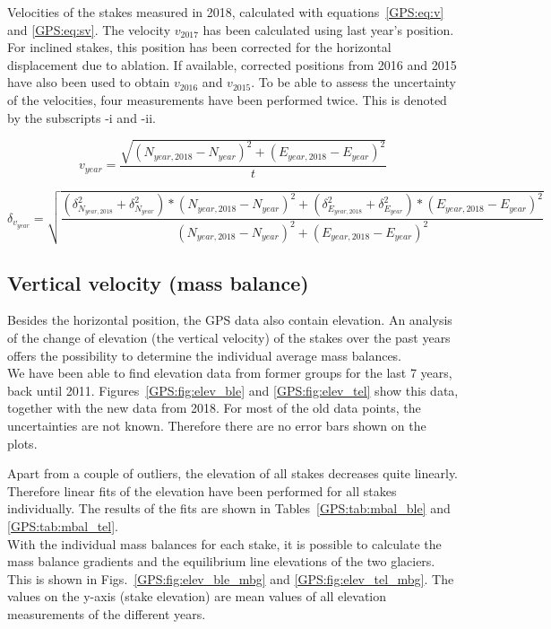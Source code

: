 \begin{table}[htb]
	\caption{Velocities of the stakes measured in 2018, calculated with equations~\ref{GPS:eq:v} and \ref{GPS:eq:sv}.
	The velocity $v_{2017}$ has been calculated using last year's position.
	For inclined stakes, this position has been corrected for the horizontal displacement due to ablation.
	If available, corrected positions from 2016 and 2015 have also been used to obtain $v_{2016}$ and $v_{2015}$.
	To be able to assess the uncertainty of the velocities, four measurements have been performed twice.
	This is denoted by the subscripts -i and -ii.}
	\centering
	
	\label{GPS:tab:vel_tab}
\end{table}

\begin{equation}
\label{GPS:eq:v}
v_{year} = \frac{\sqrt{(N_{year, 2018}-N_{year})^2+(E_{year, 2018} - E_{year})^2}}{t}
\end{equation}

\begin{equation}
\label{GPS:eq:sv}
\delta_{v_{year}} = \sqrt{\frac{
(\delta_{N_{year, 2018}}^2 + \delta_{N_{year}}^2) * (N_{year, 2018}-N_{year})^2 +
(\delta_{E_{year, 2018}}^2 + \delta_{E_{year}}^2) * (E_{year, 2018}-E_{year})^2}
{(N_{year, 2018} - N_{year})^2+ (E_{year, 2018} - E_{year})^2}}
\end{equation}


\subsection{Vertical velocity (mass balance)} \label{GPS:subsec:maba}

Besides the horizontal position, the GPS data also contain elevation.
An analysis of the change of elevation (the vertical velocity) of the stakes over the past years offers the possibility to determine the individual average mass balances.\\
We have been able to find elevation data from former groups for the last 7 years,
back until 2011.
Figures~\ref{GPS:fig:elev_ble} and \ref{GPS:fig:elev_tel} show this data,
together with the new data from 2018.
For most of the old data points, the uncertainties are not known.
Therefore there are no error bars shown on the plots.

Apart from a couple of outliers, the elevation of all stakes decreases quite linearly.
Therefore linear fits of the elevation have been performed for all stakes individually.
The results of the fits are shown in Tables~\ref{GPS:tab:mbal_ble} and \ref{GPS:tab:mbal_tel}.\\
With the individual mass balances for each stake,
it is possible to calculate the mass balance gradients and the equilibrium line elevations of the two glaciers.
This is shown in Figs.~\ref{GPS:fig:elev_ble_mbg} and \ref{GPS:fig:elev_tel_mbg}.
The values on the y-axis (stake elevation) are mean values of all elevation measurements of the different years.

